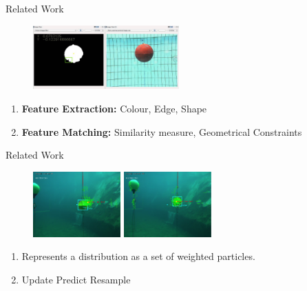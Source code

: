 \documentclass{beamer}
\begin{document}
\begin{frame}{Related Work}
        \begin{figure}
            \centering
            \includegraphics[width=0.5\textwidth]{figs/blob_detection.jpg}
        \end{figure}
        \begin{enumerate}
            \item \textbf{Feature Extraction:} Colour, Edge, Shape
            \item \textbf{Feature Matching:} Similarity measure, Geometrical Constraints
        \end{enumerate}
\end{frame}

\begin{frame}{Related Work}
        \begin{figure}
            \centering
            \includegraphics[width=0.3\textwidth]{figs/pf_buoy_0.png}\hspace{5em}
            \includegraphics[width=0.3\textwidth]{figs/pf_buoy_1.png}
        \end{figure}
        \begin{enumerate}
            \item Represents a distribution as a set of weighted particles.
            \item Update \to Predict \to Resample
        \end{enumerate}
\end{frame}

\end{document}

